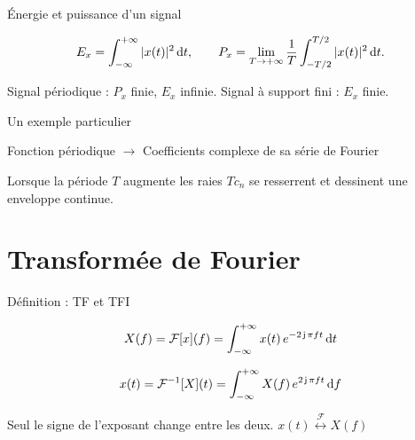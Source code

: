 \documentclass[aspectratio=43,10pt]{beamer}
\newcommand{\highlight}[1]{{\color{niceblue}\emph{#1}}}
\newcommand{\tf}{\overset{\mathcal F}{\longleftrightarrow}}
\newcommand{\slidefig}[2]{%
\begin{center}
\resizebox{#1}{!}{}
\end{center}
}
\begin{document}
\begin{frame}{Énergie et puissance d'un signal}
    \begin{definition}
        $$
            E_x = \int_{-\infty}^{+\infty} |x(t)|^2\,{\rm d} t, \qquad
            P_x = \lim_{T\to+\infty} \frac1T\int_{-T/2}^{T/2} |x(t)|^2\,{\rm d} t.
        $$
    \end{definition}
    \slidefig{0.85\textwidth}{energy-vs-power.tex}
    \begin{center}
        \small Signal périodique : $P_x$ finie, $E_x$ infinie. \quad
        Signal à support fini : $E_x$ finie.
    \end{center}
\end{frame}

\begin{frame}{Un exemple particulier}
    \begin{overprint}
    \slidefig{\textwidth}{intro-limit-small-T.tex}
    \begin{center}\small Fonction périodique $\to$   Coefficients complexe de sa série de Fourier\end{center}
    \slidefig{\textwidth}{intro-limit-large-T.tex}
    \begin{center}\small Lorsque la période $T$ augmente les raies $Tc_n$ se resserrent et
    dessinent une enveloppe continue.\end{center}
    \end{overprint}
\end{frame}



\section{Transformée de Fourier}

\begin{frame}{Définition : TF et TFI}
    \begin{definition}
        $$
            X(f) = \mathcal F[x](f) = \int_{-\infty}^{+\infty} x(t)\,e^{-2\operatorname{\mathsf{j}}\pi ft}\,{\rm d} t
        $$
    \end{definition}
    \begin{definition}
        $$
            x(t) = \mathcal F^{-1}[X](t) = \int_{-\infty}^{+\infty} X(f)\,e^{2\operatorname{\mathsf{j}}\pi ft}\,{\rm d} f
        $$
    \end{definition}
    \begin{center}
        \small Seul le signe de l'exposant change entre les deux.
        \quad $x(t)\tf X(f)$
    \end{center}
\end{frame}
\end{document}
